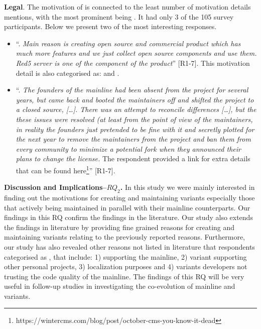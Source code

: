 \nd \textbf{Legal}. The motivation of  is connected to the least number of motivation details mentions, with the most prominent being . It had only 3 of the 105 survey participants. Below we present two of the most interesting responses.

\begin{itemize}[leftmargin=*]
\item ``. \emph{Main reason is creating open source and commercial product which has much more features and we just collect open source components and use them. Red5 server is one of the component of the product}'' [R1-7]. This motivation detail is also categorised as:  and .

\item ``. \emph{The founders of the mainline had been absent from the project for several years, but came back and booted the maintainers off and shifted the project to a closed source, [\ldots]. There was an attempt to reconcile differences [\ldots], but the these issues were resolved (at least from the point of view of the maintainers, in reality the founders just pretended to be fine with it and secretly plotted for the next year to remove the maintainers from the project and ban them from every community to minimize a potential fork when they announced their plans to change the license.} The respondent provided a link for extra details that can be found here\footnote{https://wintercms.com/blog/post/october-cms-you-know-it-dead}'' [R1-7].

\end{itemize}


\nd \textbf{Discussion and Implications--$RQ_2$.}
In this study we were mainly interested in finding out the motivations for creating and maintaining variants especially those that actively being maintained in parallel with their mainline counterparts.
Our findings in this RQ confirm the findings in the literature. 
Our study also extends the findings in literature by providing fine grained reasons for creating and maintaining variants relating to the previously reported reasons.
Furthermore, our study has also revealed other reasons not listed in literature that respondents categorised as , that include: 1) supporting the mainline, 2) variant supporting other personal projects, 3) localization purposes and 4) variants developers not trusting the code quality of the mainline. 
The findings of this RQ will be very useful in follow-up studies in investigating the co-evolution of mainline and variants. 


